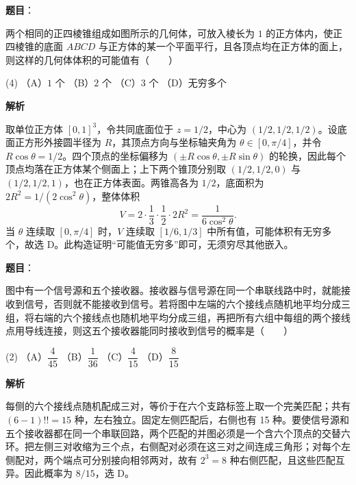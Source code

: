 \begin{answer}

\textbf{题目}：

两个相同的正四棱锥组成如图所示的几何体，可放入棱长为 $1$ 的正方体内，使正四棱锥的底面 $ABCD$ 与正方体的某一个平面平行，且各顶点均在正方体的面上，则这样的几何体体积的可能值有\mbox{（　　）}

\begin{gkopts}(4)
\task （A）$1$ 个
\task （B）$2$ 个
\task （C）$3$ 个
\task （D）无穷多个
\end{gkopts}
\nopagebreak[4]
\begin{center}\end{center}
\nopagebreak[4]
\textbf{解析}

取单位正方体 $[0,1]^3$，令共同底面位于 $z=1/2$，中心为 $(1/2,1/2,1/2)$。设底面正方形外接圆半径为 $R$，其顶点方向与坐标轴夹角为 $\theta\in[0,\pi/4]$，并令 $R\cos\theta=1/2$。四个顶点的坐标偏移为 $(\pm R\cos\theta,\pm R\sin\theta)$ 的轮换，因此每个顶点均落在正方体某个侧面上；上下两个锥顶分别取 $(1/2,1/2,0)$ 与 $(1/2,1/2,1)$，也在正方体表面。两锥高各为 $1/2$，底面积为 $2R^2=1/(2\cos^2\theta)$，整体体积
\nopagebreak[4]
\[V=2\cdot\frac13\cdot\frac12\cdot2R^2=\frac1{6\cos^2\theta}.\]
当 $\theta$ 连续取 $[0,\pi/4]$ 时，$V$ 连续取 $[1/6,1/3]$ 中所有值，可能体积有无穷多个，故选 D。此构造证明“可能值无穷多”即可，无须穷尽其他嵌入。


\end{answer}
\begin{answer}

\textbf{题目}：

图中有一个信号源和五个接收器。接收器与信号源在同一个串联线路中时，就能接收到信号，否则就不能接收到信号。若将图中左端的六个接线点随机地平均分成三组，将右端的六个接线点也随机地平均分成三组，再把所有六组中每组的两个接线点用导线连接，则这五个接收器能同时接收到信号的概率是\mbox{（　　）}

\begin{gkopts}(2)
\task （A）$\dfrac{4}{45}$
\task （B）$\dfrac{1}{36}$
\task （C）$\dfrac{4}{15}$
\task （D）$\dfrac{8}{15}$
\end{gkopts}
\nopagebreak[4]
\begin{center}\end{center}
\nopagebreak[4]
\textbf{解析}

每侧的六个接线点随机配成三对，等价于在六个支路标签上取一个完美匹配；共有 $(6-1)!!=15$ 种，左右独立。固定左侧匹配后，右侧也有 15 种。要使信号源和五个接收器都在同一个串联回路，两个匹配的并图必须是一个含六个顶点的交替六环。把左侧三对收缩为三个点，右侧配对必须在这三对之间连成三角形；对每个左侧配对，两个端点可分别接向相邻两对，故有 $2^3=8$ 种右侧匹配，且这些匹配互异。因此概率为 $8/15$，选 D。


\end{answer}

